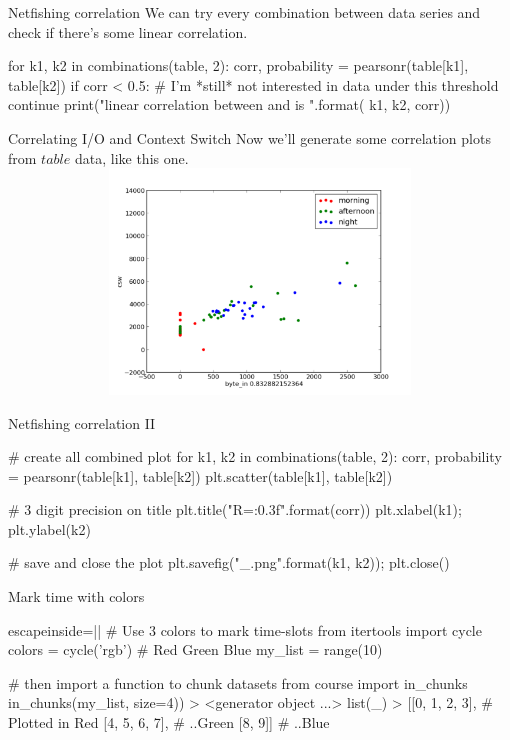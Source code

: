 \begin{pyframe}{Netfishing correlation}
We can try every combination between data series and check if there's some linear correlation.
\begin{pycode}
for k1, k2 in combinations(table, 2):
  corr, probability = pearsonr(table[k1], table[k2])
  if corr < 0.5:
    # I'm *still* not interested in data under this threshold
    continue
  print("linear correlation between {} and {} is {}".format(
    k1, k2, corr))

\end{pycode}
\end{pyframe}


\begin{pyframe}{Correlating I/O and Context Switch}
{\footnotesize Now we'll generate some correlation plots from $table$ data, like this one.}
\includegraphics[height=6cm,width=14cm]{byte_in_csw.pdf}
\end{pyframe}


\begin{pyframe}{Netfishing correlation II}
\begin{pycode}
# create all combined plot
for k1, k2 in combinations(table, 2):
    corr, probability = pearsonr(table[k1], table[k2])
    plt.scatter(table[k1], table[k2])

    # 3 digit precision on title
    plt.title("R={:0.3f}".format(corr))
    plt.xlabel(k1); plt.ylabel(k2)

    # save and close the plot
    plt.savefig("{}_{}.png".format(k1, k2)); plt.close()
\end{pycode}
\end{pyframe}


\begin{pyframe}{Mark time with colors}
\begin{pycode*}{escapeinside=||}
# Use 3 colors to mark time-slots
from itertools import cycle
colors = cycle('rgb') # Red Green Blue
my_list = range(10)

# then import a function to chunk datasets
from course import in_chunks
in_chunks(my_list, size=4))
> <generator object ...>
list(_)
> [[0, 1, 2, 3], # Plotted in Red
   [4, 5, 6, 7], # ..Green
   [8, 9]]       # ..Blue 
\end{pycode*}
\end{pyframe}

